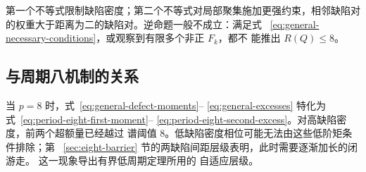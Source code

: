 第一个不等式限制缺陷密度；第二个不等式对局部聚集施加更强约束，相邻缺陷对
的权重大于距离为二的缺陷对。逆命题一般不成立：满足式~
\eqref{eq:general-necessary-conditions}，或观察到有限多个非正 \(F_k\)，都不
能推出 \(R(Q)\leq8\)。

\subsection{与周期八机制的关系}

当 \(p=8\) 时，式~\eqref{eq:general-defect-moments}--
\eqref{eq:general-excesses} 特化为式~\eqref{eq:period-eight-first-moment}--
\eqref{eq:period-eight-second-excess}。对高缺陷密度，前两个超额量已经越过
谱阈值 8。低缺陷密度相位可能无法由这些低阶矩条件排除；第~
\ref{sec:eight-barrier} 节的两缺陷间距层级表明，此时需要逐渐加长的闭游走。
这一现象导出有界低周期定理所用的
自适应层级。
